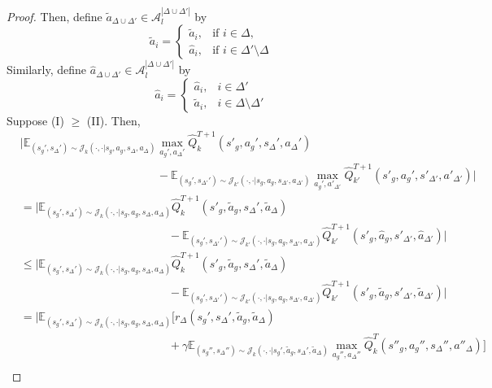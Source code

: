 \documentclass[10pt,a4paper]{amsart}
\def\E{\mathbb{E}}
\begin{document}
\begin{proof}
Then, define $\tilde{a}_{\Delta\cup\Delta'} \in \mathcal{A}_l^{|\Delta\cup\Delta'|}$ by 
\[\tilde{a}_i = \begin{cases}\tilde{a}_i,& \text{if $i\in\Delta$},\\ \hat{a}_i,& \text{if $i\in\Delta'\setminus\Delta$}\end{cases}\] 
Similarly, define $\hat{a}_{\Delta\cup\Delta'}\in\mathcal{A}_l^{|\Delta\cup\Delta'|}$ by
\[\hat{a}_i = \begin{cases}\hat{a}_i, & i\in\Delta'\\ \tilde{a}_i, & i\in\Delta\setminus\Delta' \end{cases}\]
Suppose (I) $\geq$ (II). Then, 
\begin{align*}
&\bigg|\E_{(s_g',s_\Delta')\sim{\mathcal{J}_k(\cdot,\cdot|s_g,a_g,s_\Delta,a_\Delta)}} \max_{a_g',a_\Delta'}\hat{Q}_k^{T+1}(s'_g,a_g',s_\Delta',a_\Delta') \\
&\quad\quad\quad\quad\quad\quad\quad\quad\quad\quad\quad\quad -\E_{(s_g',s_{\Delta'}')\sim{\mathcal{J}_{k'}(\cdot,\cdot|s_g,a_g,s_{\Delta'},a_{\Delta'})}}\max_{a_g',a'_{\Delta'}}\hat{Q}_{k'}^{T+1}(s'_g, a_g',s'_{\Delta'}, a'_{\Delta'})\bigg| 
\end{align*}\begin{align*}
&= \bigg|\E_{(s_g',s_\Delta')\sim{\mathcal{J}_k(\cdot,\cdot|s_g,a_g,s_\Delta,a_\Delta)}} \hat{Q}_k^{T+1}(s'_g,\tilde{a}_g,s_\Delta',\tilde{a}_\Delta) \\ &\quad\quad\quad\quad\quad\quad\quad\quad\quad\quad\quad\quad\quad-\E_{(s_g',s_{\Delta'}')\sim{\mathcal{J}_{k'}(\cdot,\cdot|s_g,a_g,s_{\Delta'},a_{\Delta'})}}\hat{Q}_{k'}^{T+1}(s'_g, \hat{a}_g,s'_{\Delta'}, \hat{a}_{\Delta'})\bigg|\\
&\leq \bigg|\E_{(s_g',s_\Delta')\sim{\mathcal{J}_k(\cdot,\cdot|s_g,a_g,s_\Delta,a_\Delta)}} \hat{Q}_k^{T+1}(s'_g,\tilde{a}_g,s_\Delta',\tilde{a}_\Delta) \\
&\quad\quad\quad\quad\quad\quad\quad\quad\quad\quad\quad\quad\quad-\E_{(s_g',s_{\Delta'}')\sim{\mathcal{J}_{k'}(\cdot,\cdot|s_g,a_g,s_{\Delta'},a_{\Delta'})}}\hat{Q}_{k'}^{T+1}(s'_g, \tilde{a}_g,s'_{\Delta'}, \tilde{a}_{\Delta'})\bigg| \\
&=\bigg|\E_{(s_g',s_\Delta')\sim{\mathcal{J}_k(\cdot,\cdot|s_g,a_g,s_\Delta,a_\Delta)}} \bigg[r_\Delta(s_g',s_\Delta',\tilde{a}_g,\tilde{a}_\Delta)\\
&\quad\quad\quad\quad\quad\quad\quad\quad\quad\quad\quad\quad\quad+\gamma\E_{(s_g'',s_\Delta'')\sim\mathcal{J}_k(\cdot,\cdot|s_g',\tilde{a}_g,s_\Delta',\tilde{a}_\Delta)}\max_{a_g'',a_\Delta''}\hat{Q}_k^{T}(s''_g,a_g'',s_\Delta'',{a}''_\Delta)\bigg]\\

\end{align*}
\end{proof}
\end{document}
